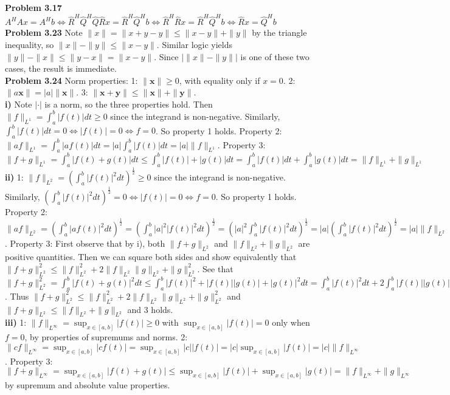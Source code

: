 \documentclass[letterpaper,12pt]{article}
\theoremstyle{definition}
\begin{document}
\noindent\textbf{Problem 3.17}
$A^HAx = A^Hb \Leftrightarrow \widehat{R}^H\widehat{Q}^H\widehat{Q}\widehat{R}x = \widehat{R}^H\widehat{Q}^Hb \Leftrightarrow \widehat{R}^H\widehat{R}x = \widehat{R}^H\widehat{Q}^Hb \Leftrightarrow \widehat{R}x = \widehat{Q}^Hb$\\


\noindent\textbf{Problem 3.23}
Note $\| x \| = \|x + y -y\| \leq \|x - y\| + \|y \|$ by the triangle inequality, so $\|x\|-\|y\| \leq \|x-y\|$. Similar logic yields $\|y\|-\|x\| \leq \|y-x\| = \|x-y\|$. Since $\left| \|x\|-\|y\| \right|$ is one of these two cases, the result is immediate.\\

\noindent\textbf{Problem 3.24}
Norm properties: 1: $\| \textbf{x} \| \geq 0$, with equality only if $x=0$. 2: $\|a\textbf{x}\| = |a|\|\textbf{x}\|$. 3: $\|\textbf{x}+\textbf{y}\| \leq \|\textbf{x}\|+\|\textbf{y}\|$.\\
\textbf{i)} Note $|\cdot|$ is a norm, so the three properties hold. Then $\|f\|_{L^1} = \int_a^b |f(t)| dt \geq 0$ since the integrand is non-negative. Similarly, $\int_a^b |f(t)| dt = 0 \Leftrightarrow |f(t)| = 0 \Leftrightarrow f = 0$. So property 1 holds. Property 2: $\|af\|_{L^1} = \int_a^b |af(t)| dt = |a|\int_a^b |f(t)| dt = |a|\|f\|_{L^1}$. Property 3: $\|f+g\|_{L^1} = \int_a^b |f(t)+g(t)| dt \leq \int_a^b |f(t)| + |g(t)|dt = \int_a^b |f(t)| dt + \int_a^b |g(t)| dt = \|f\|_{L^1} + \|g\|_{L^1}$\\
\textbf{ii)} 1: $\|f\|_{L^2} = \left( \int_a^b |f(t)|^2 dt \right) ^{\frac{1}{2}} \geq 0$ since the integrand is non-negative. Similarly, $\left( \int_a^b |f(t)|^2 dt \right) ^{\frac{1}{2}} = 0 \Leftrightarrow |f(t)| = 0 \Leftrightarrow f = 0$. So property 1 holds. Property 2: $\|af\|_{L^2} = \left( \int_a^b |af(t)|^2 dt \right) ^{\frac{1}{2}} = \left( \int_a^b |a|^2|f(t)|^2 dt \right) ^{\frac{1}{2}} = \left( |a|^2 \int_a^b |f(t)|^2 dt \right) ^{\frac{1}{2}} = |a|\left( \int_a^b |f(t)|^2 dt \right) ^{\frac{1}{2}} = |a|\|f\|_{L^2}$. Property 3: First observe that by i), both $\|f+g\|_{L^2}$ and $\|f\|_{L^2}+\|g\|_{L^2}$ are positive quantities. Then we can square both sides and show equivalently that $\|f+g\|_{L^2}^2 \leq \|f\|_{L^2}^2 + 2\|f\|_{L^2}\|g\|_{L^2} + \|g\|_{L^2}^2$. See that $\|f+g\|_{L^2}^2 = \int_a^b |f(t)+g(t)|^2 dt \leq \int_a^b |f(t)|^2 + |f(t)||g(t)| + |g(t)|^2 dt = \int_a^b |f(t)|^2 dt + 2 \int_a^b |f(t)||g(t)|dt + \int_a^b |g(t)|^2 dt = \|f\|_{L^2}^2 + 2\|f\|_{L^2}\|g\|_{L^2} + \|g\|_{L^2}^2$. Thus $\|f+g\|_{L^2}^2 \leq \|f\|_{L^2}^2 + 2\|f\|_{L^2}\|g\|_{L^2} + \|g\|_{L^2}^2$ and $\|f+g\|_{L^2} \leq \|f\|_{L^2} + \|g\|_{L^2}$ and 3 holds.\\
\textbf{iii)} 1: $\|f\|_{L^{\infty}}=\sup_{x \in [a,b]}|f(t)| \geq 0$ with $\sup_{x \in [a,b]}|f(t)| = 0$ only when $f=0$, by properties of supremums and norms. 2: $\|cf\|_{L^{\infty}}=\sup_{x \in [a,b]}|cf(t)| = \sup_{x \in [a,b]}|c||f(t)| = |c|\sup_{x \in [a,b]}|f(t)| = |c|\|f\|_{L^{\infty}}$. Property 3: $\|f+g\|_{L^{\infty}}=\sup_{x \in [a,b]}|f(t)+g(t)| \leq \sup_{x \in [a,b]}|f(t)| + \sup_{x \in [a,b]}|g(t)| = \|f\|_{L^{\infty}} + \|g\|_{L^{\infty}}$ by supremum and absolute value properties.
\end{document}

